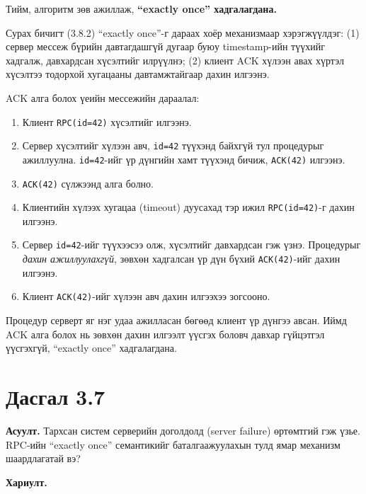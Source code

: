 \documentclass[12pt,a4paper]{article}
\newcommand{\question}[2]{\section{Дасгал #1}\textbf{Асуулт.} #2\par\medskip\textbf{Хариулт.}\par}
\begin{document}
Тийм, алгоритм зөв ажиллаж, \textbf{“exactly once” хадгалагдана.}

Сурах бичигт (3.8.2) “exactly once”-г дараах хоёр механизмаар хэрэгжүүлдэг: (1) сервер мессеж бүрийн давтагдашгүй дугаар буюу timestamp-ийн түүхийг хадгалж, давхардсан хүсэлтийг илрүүлнэ; (2) клиент ACK хүлээн авах хүртэл хүсэлтээ тодорхой хугацааны давтамжтайгаар дахин илгээнэ.

ACK алга болох үеийн мессежийн дараалал:
\begin{enumerate}[leftmargin=1.5em]
  \item Клиент \texttt{RPC(id=42)} хүсэлтийг илгээнэ.
  \item Сервер хүсэлтийг хүлээн авч, \texttt{id=42} түүхэнд байхгүй тул процедурыг ажиллуулна. \texttt{id=42}-ийг үр дүнгийн хамт түүхэнд бичиж, \texttt{ACK(42)} илгээнэ.
  \item \texttt{ACK(42)} сүлжээнд алга болно.
  \item Клиентийн хүлээх хугацаа (timeout) дуусахад тэр ижил \texttt{RPC(id=42)}-г дахин илгээнэ.
  \item Сервер \texttt{id=42}-ийг түүхээсээ олж, хүсэлтийг давхардсан гэж үзнэ. Процедурыг \emph{дахин ажиллуулахгүй}, зөвхөн хадгалсан үр дүн бүхий \texttt{ACK(42)}-ийг дахин илгээнэ.
  \item Клиент \texttt{ACK(42)}-ийг хүлээн авч дахин илгээхээ зогсооно.
\end{enumerate}

Процедур серверт яг нэг удаа ажилласан бөгөөд клиент үр дүнгээ авсан. Иймд ACK алга болох нь зөвхөн дахин илгээлт үүсгэх боловч давхар гүйцэтгэл үүсгэхгүй, “exactly once” хадгалагдана.

\question{3.7}{Тархсан систем серверийн доголдолд (server failure) өртөмтгий гэж үзье. RPC-ийн “exactly once” семантикийг баталгаажуулахын тулд ямар механизм шаардлагатай вэ?}
\end{document}
